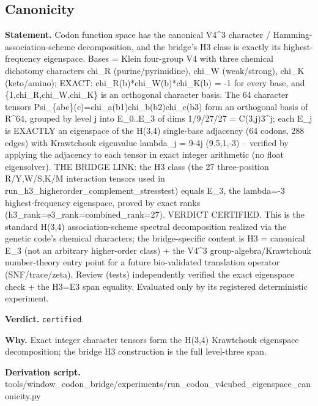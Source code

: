 \subsection{Canonicity}\label{sec:bridge-canonicity}
\textbf{Statement.} Codon function space has the canonical V4\textasciicircum{}3 character / Hamming-association-scheme
decomposition, and the bridge's H3 class is exactly its highest-frequency eigenspace. Bases = Klein
four-group V4 with three chemical dichotomy characters chi\_R (purine/pyrimidine), chi\_W
(weak/strong), chi\_K (keto/amino); EXACT: chi\_R(b)*chi\_W(b)*chi\_K(b) = -1 for every base, and
\{1,chi\_R,chi\_W,chi\_K\} is an orthogonal character basis. The 64 character tensors
Psi\_\{abc\}(c)=chi\_a(b1)chi\_b(b2)chi\_c(b3) form an orthogonal basis of R\textasciicircum{}64,
grouped by level j into E\_0..E\_3 of dims 1/9/27/27 = C(3,j)3\textasciicircum{}j; each E\_j is
EXACTLY an eigenspace of the H(3,4) single-base adjacency (64 codons, 288 edges) with Krawtchouk
eigenvalue lambda\_j = 9-4j (9,5,1,-3) -- verified by applying the adjacency to each tensor in exact
integer arithmetic (no float eigensolver). THE BRIDGE LINK: the H3 class (the 27 three-position
R/Y,W/S,K/M interaction tensors used in run\_h3\_higherorder\_complement\_stresstest) equals E\_3,
the lambda=-3 highest-frequency eigenspace, proved by exact ranks
(h3\_rank=e3\_rank=combined\_rank=27). VERDICT CERTIFIED. This is the standard H(3,4)
association-scheme spectral decomposition realized via the genetic code's chemical characters; the
bridge-specific content is H3 = canonical E\_3 (not an arbitrary higher-order class) + the
V4\textasciicircum{}3 group-algebra/Krawtchouk number-theory entry point for a future bio-validated
translation operator (SNF/trace/zeta). Review (tests) independently verified the exact eigenspace
check + the H3=E3 span equality. Evaluated only by its registered deterministic experiment.

\textbf{Verdict.} \texttt{certified}.

\textbf{Why.} Exact integer character tensors form the H(3,4) Krawtchouk eigenspace decomposition; the bridge H3
construction is the full level-three span.

\textbf{Derivation script.} tools/window\_codon\_bridge/experiments/run\_codon\_v4cubed\_eigenspace\_canonicity.py

